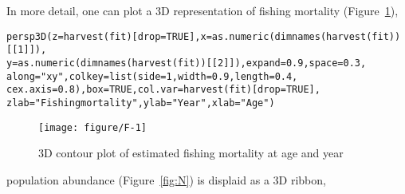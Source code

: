 \documentclass[a4paper,english,10pt]{article}\usepackage[]{graphicx}\usepackage[]{color}
\makeatletter
\def\maxwidth{ %
  \ifdim\Gin@nat@width>\linewidth
    \linewidth
  \else
    \Gin@nat@width
  \fi
}
\newcommand{\hlnum}[1]{\textcolor[rgb]{0.2,0.2,0.2}{#1}}%
\newcommand{\hlstr}[1]{\textcolor[rgb]{0.2,0.2,0.2}{#1}}%
\newcommand{\hlstd}[1]{\textcolor[rgb]{0,0,0}{#1}}%
\newcommand{\hlkwc}[1]{\textcolor[rgb]{0.361,0.506,0.596}{#1}}%
\newcommand{\hlkwd}[1]{\textcolor[rgb]{0.361,0.506,0.596}{#1}}%
\newenvironment{kframe}{%
 \def\at@end@of@kframe{}%
 \ifinner\ifhmode%
  \def\at@end@of@kframe{\end{minipage}}%
  \begin{minipage}{\columnwidth}%
 \fi\fi%
 \def\FrameCommand##1{\hskip\@totalleftmargin \hskip-\fboxsep
 \colorbox{shadecolor}{##1}\hskip-\fboxsep
     \hskip-\linewidth \hskip-\@totalleftmargin \hskip\columnwidth}%
 \MakeFramed {\advance\hsize-\width
   \@totalleftmargin\z@ \linewidth\hsize
   \@setminipage}}%
 {\par\unskip\endMakeFramed%
 \at@end@of@kframe}
\newenvironment{knitrout}{}{} %
\makeatother
\begin{document}
In more detail, one can plot a 3D representation of fishing mortality (Figure~\ref{fig:F}),

\begin{knitrout}
\color{fgcolor}\begin{kframe}
\begin{alltt}
\hlkwd{persp3D}\hlstd{(}\hlkwc{z}\hlstd{=}\hlkwd{harvest}\hlstd{(fit)[}\hlkwc{drop}\hlstd{=}\hlnum{TRUE}\hlstd{],} \hlkwc{x}\hlstd{=}\hlkwd{as.numeric}\hlstd{(}\hlkwd{dimnames}\hlstd{(}\hlkwd{harvest}\hlstd{(fit))[[}\hlnum{1}\hlstd{]]),}
        \hlkwc{y}\hlstd{=}\hlkwd{as.numeric}\hlstd{(}\hlkwd{dimnames}\hlstd{(}\hlkwd{harvest}\hlstd{(fit))[[}\hlnum{2}\hlstd{]]),} \hlkwc{expand} \hlstd{=} \hlnum{0.9}\hlstd{,} \hlkwc{space} \hlstd{=} \hlnum{0.3}\hlstd{,}
        \hlkwc{along} \hlstd{=} \hlstr{"xy"}\hlstd{,} \hlkwc{colkey} \hlstd{=} \hlkwd{list}\hlstd{(}\hlkwc{side}\hlstd{=}\hlnum{1}\hlstd{,} \hlkwc{width} \hlstd{=} \hlnum{0.9}\hlstd{,} \hlkwc{length} \hlstd{=} \hlnum{0.4}\hlstd{,}
        \hlkwc{cex.axis} \hlstd{=} \hlnum{0.8}\hlstd{),} \hlkwc{box} \hlstd{=} \hlnum{TRUE}\hlstd{,} \hlkwc{col.var}\hlstd{=}\hlkwd{harvest}\hlstd{(fit)[}\hlkwc{drop}\hlstd{=}\hlnum{TRUE}\hlstd{],}
        \hlkwc{zlab}\hlstd{=}\hlstr{"Fishing mortality"}\hlstd{,} \hlkwc{ylab}\hlstd{=}\hlstr{"Year"}\hlstd{,} \hlkwc{xlab}\hlstd{=}\hlstr{"Age"}\hlstd{)}
\end{alltt}
\end{kframe}\begin{figure}[H]

{\centering \texttt{[image: figure/F-1]} 

}

\caption[3D contour plot of estimated fishing mortality at age and year]{3D contour plot of estimated fishing mortality at age and year}\label{fig:F}
\end{figure}


\end{knitrout}

population abundance (Figure~\ref{fig:N}) is displaid as a 3D ribbon, 
\end{document}
